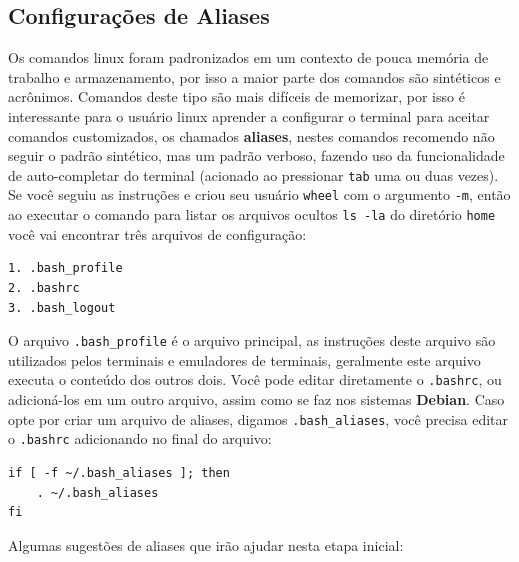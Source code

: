 \documentclass[12pt,a4paper]{article}
\begin{document}
\subsection{Configurações de Aliases}

\hspace{\baselineskip}

Os comandos linux foram padronizados em um contexto de pouca memória de trabalho e armazenamento, por isso a maior parte dos comandos são sintéticos e acrônimos. Comandos deste tipo são mais difíceis de memorizar, por isso é interessante para o usuário linux aprender a configurar o terminal para aceitar comandos customizados, os chamados \textbf{aliases}, nestes comandos recomendo não seguir o padrão sintético, mas um padrão verboso, fazendo uso da funcionalidade de auto-completar do terminal (acionado ao pressionar \texttt{tab} uma ou duas vezes).\\

Se você seguiu as instruções e criou seu usuário \texttt{wheel} com o argumento \texttt{-m}, então ao executar o comando para listar os arquivos ocultos \texttt{ls -la} do diretório \texttt{home} você vai encontrar três arquivos de configuração: \\

\begin{lstlisting}
1. .bash_profile 
2. .bashrc
3. .bash_logout
\end{lstlisting}

\vspace{\baselineskip}

O arquivo \texttt{.bash\_profile} é o arquivo principal, as instruções deste arquivo são utilizados pelos terminais e emuladores de terminais, geralmente este arquivo executa o conteúdo dos outros dois. Você pode editar diretamente o \texttt{.bashrc}, ou adicioná-los em um outro arquivo, assim como se faz nos sistemas \textbf{Debian}. Caso opte por criar um arquivo de aliases, digamos \texttt{.bash\_aliases}, você precisa editar o \texttt{.bashrc} adicionando no final do arquivo:\\

\begin{lstlisting}
if [ -f ~/.bash_aliases ]; then 
	. ~/.bash_aliases
fi
\end{lstlisting}

\vspace{\baselineskip}

Algumas sugestões de aliases que irão ajudar nesta etapa inicial: \\
\end{document}
